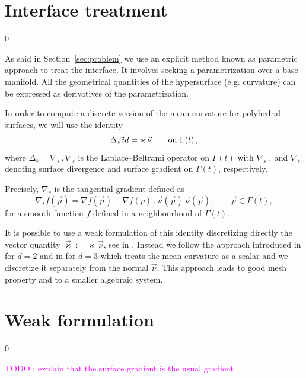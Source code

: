 \documentclass[a4paper,12pt,onecolumn]{article}
\newcommand{\nabs}{\nabla_{\!s}}
\newcommand{\id}{\rm id}
\begin{document}
\section{Interface treatment}
\setcounter{equation} 0

As said in Section~\ref{sec:problem} we use an explicit method known as parametric approach to treat the interface. It involves seeking a parametrization over a base manifold. All the geometrical quantities of the hypersurface (e.g. curvature) can be expressed as derivatives of the parametrization.

In order to compute a discrete version of the mean curvature for polyhedral surfaces, we will use the identity
\begin{equation} \label{eq:LBop}
\Delta_s\, \vec \id = \varkappa\, \vec\nu \qquad \mbox{on $\Gamma(t)$}\,,
\end{equation}
where $\Delta_s = \nabs\,.\,\nabs$ is the Laplace--Beltrami operator on $\Gamma(t)$ with $\nabs\,.\,$ and $\nabs$ denoting surface divergence and surface gradient on $\Gamma(t)$, respectively. 

Precisely, $\nabla_s$ is the tangential gradient defined as
\begin{equation}\label{eq:tangent_gradient}
 \nabla_s f(\vec{p})=\nabla f(\vec{p})-\nabla f(p)\,.\,\vec{\nu}(\vec{p})\,\vec{\nu}(\vec{p}),\qquad \vec{p}\in\Gamma(t),
\end{equation}
for a smooth function $f$ defined in a neighbourhood of $\Gamma(t)$. 

It is possible to use a weak formulation of this identity discretizing directly the vector quantity $\vec\varkappa:=\varkappa\,\vec\nu$, see in \cite{Dziuk91,Bansch01,GanesanMT07}. Instead we follow the approach introduced in \cite{triplej} for $d=2$ and in \cite{gflows3d} for
$d=3$ which treats the mean curvature as a scalar and we discretize it separately from the normal $\vec\nu$. This approach leads to good mesh property and to a smaller algebraic system.

\section{Weak formulation}\label{sec:weak_formulation}
\setcounter{equation} 0

\textcolor{magenta}{TODO : explain that the surface gradient is the usual gradient}
\end{document}
